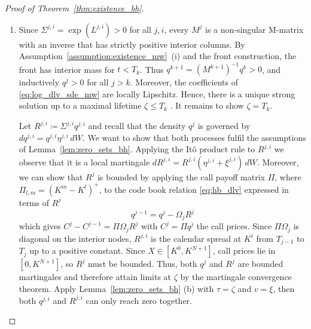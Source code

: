\documentclass[smallextended,envcountsame,envcountsect]{svjour3}
\begin{document}
\begin{proof}[Proof of Theorem~\ref{thm:existence_bh}]
\begin{enumerate}[label=(\roman*)]
  \item Since $\Sigma^{j, i} = \exp(L^{j, i}) > 0$ for all $j, i$, every $ M^j $ is a non-singular M-matrix with an inverse that has strictly positive interior columns. By Assumption~\ref{assumption:existence_mw}~(i) and the front construction, the front has interior mass for $t < T_k$. Thus $q^{k+1}=(M^{k+1})^{-1}q^k > 0$, and inductively $q^j>0$ for all $j>k$. Moreover, the coefficients of \eqref{eq:log_dlv_sde_mw} are locally Lipschitz. Hence, there is a unique strong solution up to a maximal lifetime $\zeta \leq T_k$ \citep[Theorem~V.38]{Protter2005}. It remains to show $\zeta = T_k$.
  
  Let $R^{j, i} \coloneqq \Sigma^{j, i} q^{j, i}$ and recall that the density $q^{j}$ is governed by $dq^{j, i} = q^{j, i} \eta^{j, i} \, dW$. We want to show that both processes fulfil the assumptions of Lemma~\ref{lem:zero_sets_bh}. Applying the It\^o product rule to $R^{j, i}$ we observe that it is a local martingale $dR^{j,i} = R^{j,i} ( \eta^{j,i}+\xi^{j,i} ) \, dW$. Moreover, we can show that $R^j$ is bounded by applying the call payoff matrix $\Pi$, where $\Pi_{l, m} = (K^m - K^l)^+$, to the code book relation \eqref{eq:hb_dlv} expressed in terms of $R^j$
  \begin{equation}
    \label{eq:R_codebook_mw}
    q^{j-1}=q^j - \Omega_jR^j 
  \end{equation}
  which gives $C^{j} - C^{j-1} = \Pi\Omega_j R^j $ with $C^j = \Pi q^j$ the call prices. Since $\Pi\Omega_j$ is diagonal on the interior nodes, $R^{j, i}$ is the calendar spread at $K^{i}$ from $T_{j-1}$ to $T_j$ up to a positive constant. Since $X \in [K^0, K^{N+1}]$, call prices lie in $[0, K^{N+1}]$, so $R^{j}$ must be bounded. Thus, both $q^j$ and $R^j$ are bounded martingales and therefore attain limits at $\zeta$ by the martingale convergence theorem. Apply Lemma~\ref{lem:zero_sets_bh} (b) with $\tau=\zeta$ and $v=\xi$, then both $q^{j, i}$ and $R^{j, i}$ can only reach zero together. 


\end{enumerate}
\end{proof}
\end{document}
